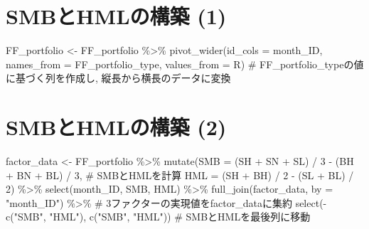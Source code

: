 \documentclass[
  letterpaper,
  DIV=11,
  numbers=noendperiod]{scrreprt}
\newenvironment{Shaded}{\begin{snugshade}}{\end{snugshade}}
\newcommand{\AttributeTok}[1]{\textcolor[rgb]{0.40,0.45,0.13}{#1}}
\newcommand{\CommentTok}[1]{\textcolor[rgb]{0.37,0.37,0.37}{#1}}
\newcommand{\DecValTok}[1]{\textcolor[rgb]{0.68,0.00,0.00}{#1}}
\newcommand{\FunctionTok}[1]{\textcolor[rgb]{0.28,0.35,0.67}{#1}}
\newcommand{\NormalTok}[1]{\textcolor[rgb]{0.00,0.23,0.31}{#1}}
\newcommand{\OtherTok}[1]{\textcolor[rgb]{0.00,0.23,0.31}{#1}}
\newcommand{\SpecialCharTok}[1]{\textcolor[rgb]{0.37,0.37,0.37}{#1}}
\newcommand{\StringTok}[1]{\textcolor[rgb]{0.13,0.47,0.30}{#1}}
\begin{document}
\section{SMBとHMLの構築 (1)}\label{smbux3068hmlux306eux69cbux7bc9-1}

\begin{Shaded}
\begin{Highlighting}[]
\NormalTok{FF\_portfolio }\OtherTok{\textless{}{-}}\NormalTok{ FF\_portfolio }\SpecialCharTok{\%\textgreater{}\%}
  \FunctionTok{pivot\_wider}\NormalTok{(}\AttributeTok{id\_cols =}\NormalTok{ month\_ID, }\AttributeTok{names\_from =}\NormalTok{ FF\_portfolio\_type, }\AttributeTok{values\_from =}\NormalTok{ R) }\CommentTok{\# FF\_portfolio\_typeの値に基づく列を作成し, 縦長から横長のデータに変換}
\end{Highlighting}
\end{Shaded}

\section{SMBとHMLの構築 (2)}\label{smbux3068hmlux306eux69cbux7bc9-2}

\begin{Shaded}
\begin{Highlighting}[]
\NormalTok{factor\_data }\OtherTok{\textless{}{-}}\NormalTok{ FF\_portfolio }\SpecialCharTok{\%\textgreater{}\%}
  \FunctionTok{mutate}\NormalTok{(}\AttributeTok{SMB =}\NormalTok{ (SH }\SpecialCharTok{+}\NormalTok{ SN }\SpecialCharTok{+}\NormalTok{ SL) }\SpecialCharTok{/} \DecValTok{3} \SpecialCharTok{{-}}\NormalTok{ (BH }\SpecialCharTok{+}\NormalTok{ BN }\SpecialCharTok{+}\NormalTok{ BL) }\SpecialCharTok{/} \DecValTok{3}\NormalTok{, }\CommentTok{\# SMBとHMLを計算}
         \AttributeTok{HML =}\NormalTok{ (SH }\SpecialCharTok{+}\NormalTok{ BH) }\SpecialCharTok{/} \DecValTok{2} \SpecialCharTok{{-}}\NormalTok{ (SL }\SpecialCharTok{+}\NormalTok{ BL) }\SpecialCharTok{/} \DecValTok{2}\NormalTok{) }\SpecialCharTok{\%\textgreater{}\%}
  \FunctionTok{select}\NormalTok{(month\_ID, SMB, HML) }\SpecialCharTok{\%\textgreater{}\%}
  \FunctionTok{full\_join}\NormalTok{(factor\_data, }\AttributeTok{by =} \StringTok{"month\_ID"}\NormalTok{) }\SpecialCharTok{\%\textgreater{}\%} \CommentTok{\# 3ファクターの実現値をfactor\_dataに集約}
  \FunctionTok{select}\NormalTok{(}\SpecialCharTok{{-}}\FunctionTok{c}\NormalTok{(}\StringTok{"SMB"}\NormalTok{, }\StringTok{"HML"}\NormalTok{), }\FunctionTok{c}\NormalTok{(}\StringTok{"SMB"}\NormalTok{, }\StringTok{"HML"}\NormalTok{)) }\CommentTok{\# SMBとHMLを最後列に移動}
\end{Highlighting}
\end{Shaded}
\end{document}
